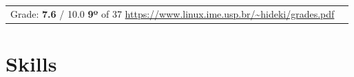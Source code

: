 \documentclass[a4paper]{deedy-resume-openfont}
\begin{document}
\begin{tabular}{@{}c c}
\begin{minipage}{0.925\textwidth}
Grade: \textbf{7.6} / 10.0 \textbullet{} \textbf{9º} of 37 \textbullet{} \url{https://www.linux.ime.usp.br/\~hideki/grades.pdf}
\end{minipage}
\end{tabular}



\sectionsep





\section{Skills}
\end{document}
